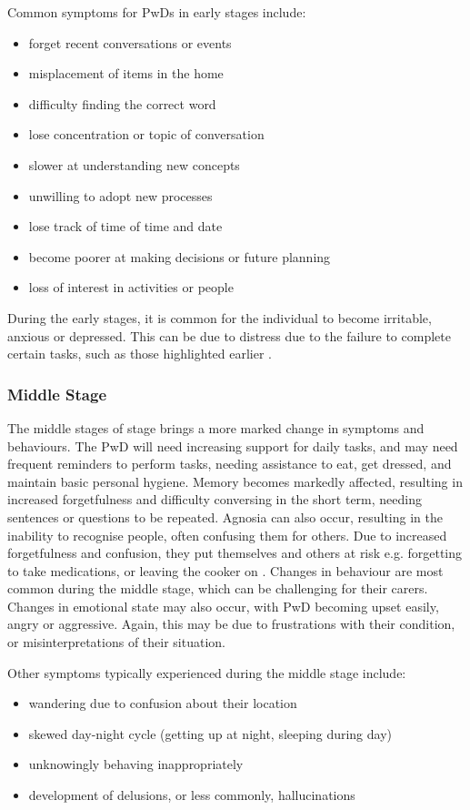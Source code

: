 Common symptoms for PwDs in early stages include:

\begin{itemize}[noitemsep,topsep=0pt]
\item forget recent conversations or events
\item misplacement of items in the home
\item difficulty finding the correct word
\item lose concentration or topic of conversation
\item slower at understanding new concepts
\item unwilling to adopt new processes
\item lose track of time of time and date
\item become poorer at making decisions or future planning
\item loss of interest in activities or people
\end{itemize}

During the early stages, it is common for the individual to become irritable, anxious or depressed. This can be due to distress due to the failure to complete certain tasks, such as those highlighted earlier .

\subsubsection{Middle Stage}
The middle stages of stage brings a more marked change in symptoms and behaviours. The PwD will need increasing support for daily tasks, and may need frequent reminders to perform tasks, needing assistance to eat, get dressed, and maintain basic personal hygiene. Memory becomes markedly affected, resulting in increased forgetfulness and difficulty conversing in the short term, needing sentences or questions to be repeated. Agnosia can also occur, resulting in the inability to recognise people, often confusing them for others. Due to increased forgetfulness and confusion, they put themselves and others at risk e.g. forgetting to take medications, or leaving the cooker on \cite{Grout2015}.
Changes in behaviour are most common during the middle stage, which can be challenging for their carers. Changes in emotional state may also occur, with PwD becoming upset easily, angry or aggressive. Again, this may be due to frustrations with their condition, or misinterpretations of their situation.

Other symptoms typically experienced during the middle stage include:
\begin{itemize}[noitemsep,topsep=0pt]
\item wandering due to confusion about their location
\item skewed day-night cycle (getting up at night, sleeping during day)
\item unknowingly behaving inappropriately
\item development of delusions, or less commonly, hallucinations
\end{itemize}


